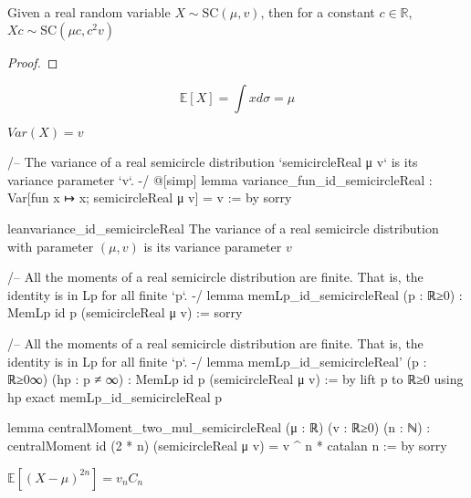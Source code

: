 \begin{lemma}\label{lem:semicircleReal_mul_const}
  \mathlibok
  \uses{}
   Given a real random variable $X \sim \mathrm{SC}(\mu, v)$,
  then for a constant $c \in \mathbb{R}$, $Xc \sim \mathrm{SC}(\mu c , c^2v)$
  \begin{proof}

  \end{proof}
\end{lemma}



\begin{lemma}\label{lem:integral_id_semicircleReal}
  \notready
  $$\mathbb{E}[X] = \int x d \sigma = \mu$$
\end{lemma}

\begin{lemma}\label{lem:variance_fun_id_semicircleReal}
  \notready
  $Var(X) = v$
\end{lemma}

/-- The variance of a real semicircle distribution `semicircleReal μ v` is
its variance parameter `v`. -/
@[simp]
lemma variance_fun_id_semicircleReal : Var[fun x ↦ x; semicircleReal μ v] = v := by
  sorry

\begin{lemma}\label{lem:variance_id_semicircleReal}
  lean{variance_id_semicircleReal}
  \notready
  The variance of a real semicircle distribution with parameter $(\mu, v)$ is
  its variance parameter $v$
\end{lemma}


/-- All the moments of a real semicircle distribution are finite. That is, the identity is in Lp for
all finite `p`. -/
lemma memLp_id_semicircleReal (p : ℝ≥0) : MemLp id p (semicircleReal μ v) :=
  sorry


/-- All the moments of a real semicircle distribution are finite. That is, the identity is in Lp for
all finite `p`. -/
lemma memLp_id_semicircleReal' (p : ℝ≥0∞) (hp : p ≠ ∞) : MemLp id p (semicircleReal μ v) := by
  lift p to ℝ≥0 using hp
  exact memLp_id_semicircleReal p



lemma centralMoment_two_mul_semicircleReal (μ : ℝ) (v : ℝ≥0) (n : ℕ) :
    centralMoment id (2 * n) (semicircleReal μ v)
    = v ^ n * catalan n := by
  sorry

\begin{lemma}\label{lem:centralMoment_two_mul_semicircleReal}
  \notready
   $\mathbb{E}[(X  - \mu)^{2n}] = v_n C_n $
\end{lemma}

